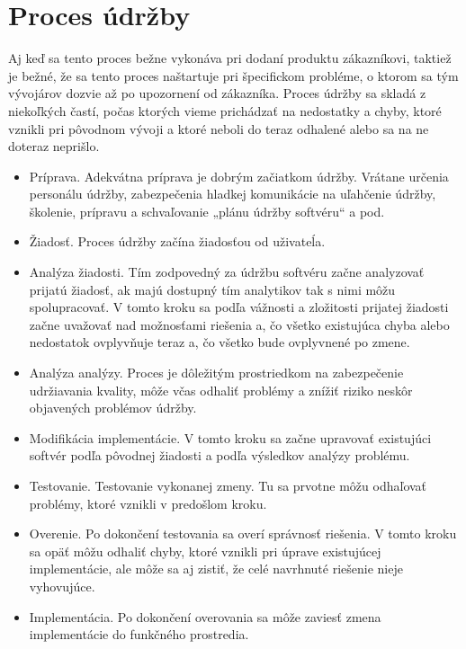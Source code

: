\documentclass[10pt,twoside,slovak,a4paper]{article}
\begin{document}
\section{Proces údržby} \label{proces}
Aj keď sa tento proces bežne vykonáva pri dodaní produktu zákazníkovi, taktiež je bežné, že sa tento proces naštartuje pri špecifickom probléme, o ktorom sa tým vývojárov dozvie až po upozornení od zákazníka.
Proces údržby sa skladá z niekoľkých častí, počas ktorých vieme prichádzať na nedostatky a chyby, ktoré vznikli pri pôvodnom vývoji a ktoré neboli do teraz odhalené alebo sa na ne doteraz neprišlo.
\begin{itemize}
    \item Príprava.\cite{6116869} Adekvátna príprava je dobrým začiatkom údržby. Vrátane určenia personálu údržby, zabezpečenia hladkej komunikácie na uľahčenie údržby, školenie, prípravu a schvaľovanie „plánu údržby softvéru“ a pod.
    \item Žiadosť.\cite{6116869} Proces údržby začína žiadosťou od uživateĺa.
    \item Analýza žiadosti.\cite{6116869} Tím zodpovedný za údržbu softvéru začne analyzovať prijatú žiadosť, ak majú dostupný tím analytikov tak s nimi môžu spolupracovať. V tomto kroku sa podľa vážnosti a zložitosti prijatej žiadosti začne uvažovať nad možnosťami riešenia a, čo všetko existujúca chyba alebo nedostatok ovplyvňuje teraz a, čo všetko bude ovplyvnené po zmene.
    \item Analýza analýzy.\cite{6116869} Proces je dôležitým prostriedkom na zabezpečenie udržiavania kvality, môže včas odhaliť problémy a znížiť riziko neskôr objavených problémov údržby.
    \item Modifikácia implementácie.\cite{6116869} V tomto kroku sa začne upravovať existujúci softvér podľa pôvodnej žiadosti a podľa výsledkov analýzy problému.
    \item Testovanie.\cite{6116869} Testovanie vykonanej zmeny. Tu sa prvotne môžu odhaľovať problémy, ktoré vznikli v predošlom kroku.
    \item Overenie.\cite{6116869} Po dokončení testovania sa overí správnosť riešenia. V tomto kroku sa opäť môžu odhaliť chyby, ktoré vznikli pri úprave existujúcej implementácie, ale môže sa aj zistiť, že celé navrhnuté riešenie nieje vyhovujúce.
    \item Implementácia.\cite{6116869} Po dokončení overovania sa môže zaviesť zmena implementácie do funkčného prostredia.
\end{itemize}
\end{document}
